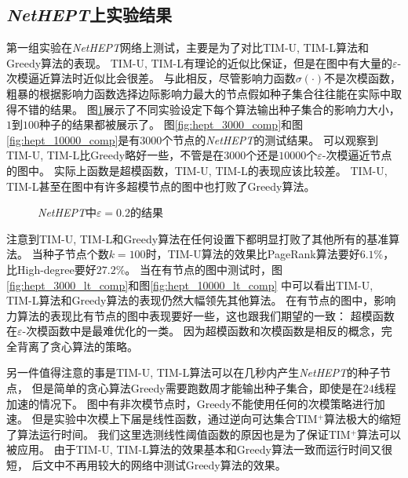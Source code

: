 \subsection{{\em NetHEPT}上实验结果}
第一组实验在{\em NetHEPT}网络上测试，主要是为了对比{\sf TIM-U, TIM-L}算法和{\sf Greedy}算法的表现。
{\sf TIM-U, TIM-L}有理论的近似比保证，但是在图中有大量的$\varepsilon$-次模逼近算法时近似比会很差。
与此相反，尽管影响力函数$\sigma(\cdot)$不是次模函数，
粗暴的根据影响力函数选择边际影响力最大的节点假如种子集合往往能在实际中取得不错的结果。
图\ref{fig:NetHEPT_comp}展示了不同实验设定下每个算法输出种子集合的影响力大小，$1$到$100$种子的结果都被展示了。
图\ref{fig:hept_3000_comp}和图\ref{fig:hept_10000_comp}是有$3000$个\easso 节点的{\em NetHEPT}的测试结果。
可以观察到{\sf TIM-U, TIM-L}比{\sf Greedy}略好一些，不管是在$3000$个还是$10000$个$\varepsilon$-次模逼近节点的图中。
实际上\easso 函数是超模函数，{\sf TIM-U, TIM-L}的表现应该比较差。
{\sf TIM-U, TIM-L}甚至在图中有许多超模节点的图中也打败了{\sf Greedy}算法。

\begin{figure}[h]
\centering
	
	\caption{{\em NetHEPT}中$\varepsilon=0.2$的结果}
	\label{fig:NetHEPT_comp}
\end{figure}


注意到{\sf TIM-U, TIM-L}和{\sf Greedy}算法在任何设置下都明显打败了其他所有的基准算法。
当种子节点个数$k=100$时，{\sf TIM-U}算法的效果比{\sf PageRank}算法要好$6.1\%$，比{\sf High-degree}要好$27.2\%$。
当在有\easst 节点的图中测试时，图\ref{fig:hept_3000_lt_comp}和图\ref{fig:hept_10000_lt_comp}
中可以看出{\sf TIM-U, TIM-L}算法和{\sf Greedy}算法的表现仍然大幅领先其他算法。
在有\easst 节点的图中，影响力算法的表现比有\easso 节点的图中表现要好一些，这也跟我们期望的一致：
超模函数在$\varepsilon$-次模函数中是最难优化的一类。
因为超模函数和次模函数是相反的概念，完全背离了贪心算法的策略。


另一件值得注意的事是{\sf TIM-U, TIM-L}算法可以在几秒内产生{\em NetHEPT}的种子节点，
但是简单的贪心算法{\sf Greedy}需要跑数周才能输出种子集合，即使是在$24$线程加速的情况下。
图中有非次模节点时，{\sf Greedy}不能使用任何的次模策略进行加速。
但是实验中次模上下届是线性函数，通过逆向可达集合{\sf TIM$^+$}算法极大的缩短了算法运行时间。
我们这里选测线性阈值函数的原因也是为了保证{\sf TIM$^+$}算法可以被应用。
由于{\sf TIM-U, TIM-L}算法的效果基本和{\sf Greedy}算法一致而运行时间又很短，
后文中不再用较大的网络中测试{\sf Greedy}算法的效果。


